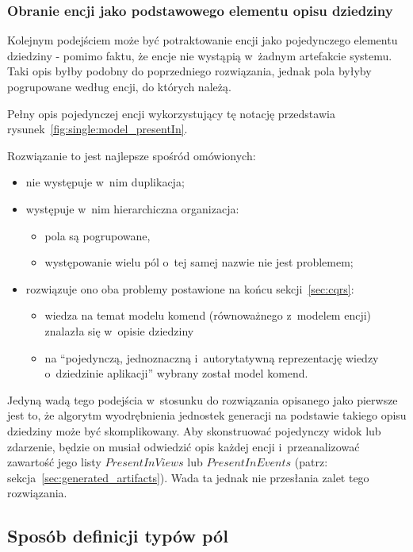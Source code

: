 \subsubsection{Obranie encji jako podstawowego elementu opisu dziedziny}

Kolejnym podejściem może być potraktowanie encji jako pojedynczego elementu dziedziny - pomimo faktu, że encje nie wystąpią w~żadnym artefakcie systemu.
Taki opis byłby podobny do poprzedniego rozwiązania, jednak pola byłyby pogrupowane według encji, do których należą.

Pełny opis pojedynczej encji wykorzystujący tę notację przedstawia rysunek~\ref{fig:single:model_presentIn}.



Rozwiązanie to jest najlepsze spośród omówionych:

\begin{itemize}
 \item nie występuje w~nim duplikacja;
 \item występuje w~nim hierarchiczna organizacja:
 \begin{itemize}
  \item pola są pogrupowane,
  \item występowanie wielu pól o~tej samej nazwie nie jest problemem;
 \end{itemize}
 \item rozwiązuje ono oba problemy postawione na końcu sekcji~\ref{sec:cqrs}:
  \begin{itemize}
   \item wiedza na temat modelu komend (równoważnego z~modelem encji) znalazła się w~opisie dziedziny
   \item na ``pojedynczą, jednoznaczną i~autorytatywną reprezentację wiedzy o~dziedzinie aplikacji'' wybrany został model komend.
  \end{itemize}
\end{itemize}

Jedyną wadą tego podejścia w~stosunku do rozwiązania opisanego jako pierwsze jest to, że algorytm wyodrębnienia jednostek generacji na podstawie takiego opisu dziedziny może być skomplikowany.
Aby skonstruować pojedynczy widok lub zdarzenie, będzie on musiał odwiedzić opis każdej encji i~przeanalizować zawartość jego listy $PresentInViews$ lub $PresentInEvents$ (patrz: sekcja~\ref{sec:generated_artifacts}).
Wada ta jednak nie przesłania zalet tego rozwiązania.


\subsection{Sposób definicji typów pól} \label{sec:field_type_definition}

